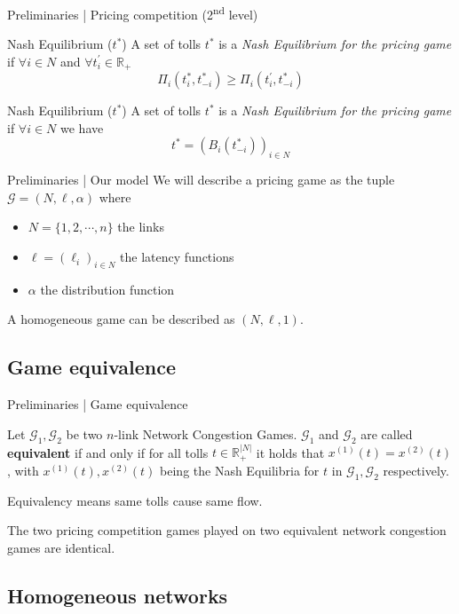 \documentclass{beamer}
\newcommand{\R}{\mathbb{R}}
\newcommand{\Gm}{\mathcal{G}}
\begin{document}
\begin{frame}{Preliminaries | Pricing competition (2\textsuperscript{nd} level)}
	\begin{block}{Nash Equilibrium ($t^*$)}
		A set of tolls $t^*$ is a \textit{Nash Equilibrium for the pricing game} if $\forall i \in N$ and $\forall t_i^\prime \in \R_+$
		\[\Pi_i(t_i^*, t_{-i}^*) \geq \Pi_i(t_i^\prime, t_{-i}^*)\]
	\end{block}
	\begin{block}{Nash Equilibrium ($t^*$)}
		A set of tolls $t^*$ is a \textit{Nash Equilibrium for the pricing game} if
		$\forall i \in N$ we have
		\[t^* = (B_i(t_{-i}^*))_{i \in N}\]
	\end{block}
\end{frame}

\begin{frame}{Preliminaries | Our model}
	We will describe a pricing game as the tuple $\Gm = (N, \ell, \alpha)$ where
	\begin{itemize}
		\item $N = \{1, 2, \cdots, n\}$ the links
		\item $\ell = (\ell_i)_{i \in N}$ the latency functions
		\item $\alpha$ the distribution function
	\end{itemize}
	A homogeneous game can be described as $(N, \ell, 1)$.
\end{frame}

\subsection{Game equivalence}

\begin{frame}{Preliminaries | Game equivalence}
	\begin{definition}
		Let $\Gm_1, \Gm_2$ be two $n$-link Network Congestion Games.
		$\Gm_1$ and $\Gm_2$ are called \textbf{equivalent} if and only if for all tolls $t \in \R_+^{|N|}$ it holds that $x^{(1)}(t) = x^{(2)}(t)$, with $x^{(1)}(t), x^{(2)}(t)$ being the Nash Equilibria for $t$ in $\Gm_1, \Gm_2$ respectively.
	\end{definition}
	Equivalency means same tolls cause same flow.

	The two pricing competition games played on two equivalent network congestion games are identical.
\end{frame}

\subsection{Homogeneous networks}
\end{document}
